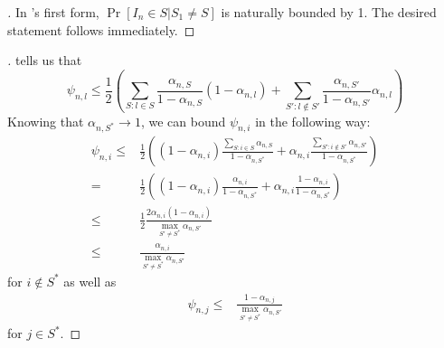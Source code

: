 \begin{proof}[]
  In 's first form,  $\Pr[I_n \in S | S_1 \neq S]$ is naturally bounded by 1. The desired statement follows immediately.
\end{proof}

\begin{proof}[]
   tells us that
  \[\psi_{n, l} \leq \frac{1}{2}(\sum_{S: l \in S} \frac{\alpha_{n, S}}{1 - \alpha_{n, S}} (1 - \alpha_{n, l}) +  \sum_{S': l \notin S'} \frac{\alpha_{n, S'}}{1 - \alpha_{n, S'}} \alpha_{n, l})\]
  Knowing that $\alpha_{n, S^*} \rightarrow 1$, we can bound $\psi_{n, i}$ in the following way:
  \begin{align}
    \psi_{n, i} \leq& \frac{1}{2}((1 - \alpha_{n, i}) \frac{\sum_{S: i \in S} \alpha_{n, S}}{1 - \alpha_{n, S^*}} + \alpha_{n, i} \frac{\sum_{S': i \notin S'} \alpha_{n, S'}}{1 - \alpha_{n, S^*}}) \\
    =& \frac{1}{2}((1 - \alpha_{n, i}) \frac{\alpha_{n, i}}{1 - \alpha_{n, S^*}} + \alpha_{n, i} \frac{1 - \alpha_{n, i}}{1 - \alpha_{n, S^*}}) \\
    \leq& \frac{1}{2} \frac{2 \alpha_{n, i} (1 - \alpha_{n, i})}{\max_{S' \neq S^*} \alpha_{n, S'}} \\
    \leq& \frac{\alpha_{n, i}}{\max_{S' \neq S^*} \alpha_{n, S'}}
  \end{align}
  for $i \notin S^*$ as well as
  \begin{align}
    \psi_{n, j} \leq& \frac{1 - \alpha_{n, j}}{\max_{S' \neq S^*} \alpha_{n, S'}}
  \end{align}
  for $j \in S^*$.
\end{proof}

